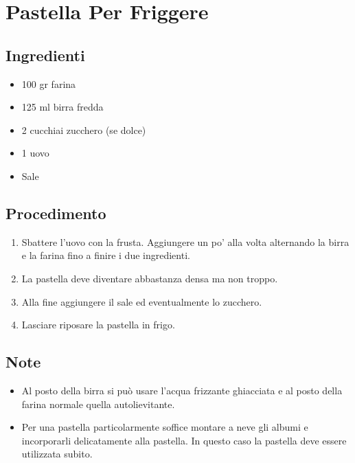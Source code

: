 \section{Pastella Per Friggere}
\subsection{Ingredienti}
\begin{itemize}
\item 100 gr farina  
\item 125 ml birra fredda  
\item 2 cucchiai zucchero (se dolce)  
\item 1 uovo   
\item Sale
\end{itemize}
\subsection{Procedimento}
\begin{enumerate}
\item  Sbattere l'uovo con la frusta. Aggiungere un po' alla volta alternando la birra e la farina fino a finire i due ingredienti.  
\item  La pastella deve diventare abbastanza densa ma non troppo.  
\item  Alla fine aggiungere il sale ed eventualmente lo zucchero.  
\item  Lasciare riposare la pastella in frigo.
\end{enumerate}
\subsection{Note}
\begin{itemize}
\item Al posto della birra si può usare l'acqua frizzante ghiacciata e al posto della farina normale quella autolievitante.  
\item Per una pastella particolarmente soffice montare a neve gli albumi e incorporarli delicatamente alla pastella. In questo caso la pastella deve essere utilizzata subito.
\end{itemize}
